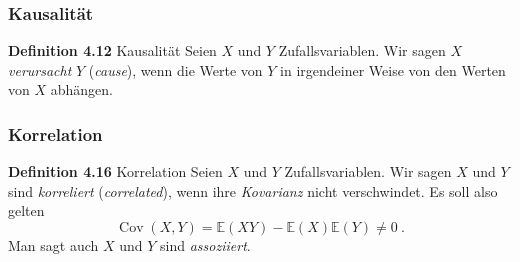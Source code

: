\documentclass{beamer}
\newcommand{\en}[1]{{\scriptsize(\textit{#1})}}
\newcommand{\kom}[1]{\ignorespaces}
\newcommand{\Cov}{\operatorname{Cov}}
\newcommand{\klein}[1]{{\scriptsize #1}}
\begin{document}
\begin{frame}
\frametitle{Kausalität}

\begin{block}{\textbf{Definition 4.12} \klein{Kausalität}}
Seien $X$ und $Y$ Zufallsvariablen. Wir sagen $X$ \textit{verursacht} $Y$ \en{cause}\kom{S. 5}, wenn die Werte von $Y$ in irgendeiner Weise von den Werten von $X$ abhängen.
\end{block}

\pause
\vspace*{3\baselineskip}

\begin{center}
\end{center}
\end{frame}

\begin{frame}
\frametitle{Korrelation}

\begin{block}{\textbf{Definition 4.16} \klein{Korrelation}}
Seien $X$ und $Y$ Zufallsvariablen. Wir sagen $X$ und $Y$ sind \textit{korreliert} \en{correlated}\kom{S. 22}, wenn ihre \textit{Kovarianz} nicht verschwindet. Es soll also gelten
\[\Cov(X, Y) = \mathbb{E}(XY) - \mathbb{E}(X) \mathbb{E}(Y) \neq 0~.\]
Man sagt auch $X$ und $Y$ sind \textit{assoziiert}.
\end{block}

\pause
\vspace*{2\baselineskip}

\begin{center}
\end{center}
\end{frame}
\end{document}
